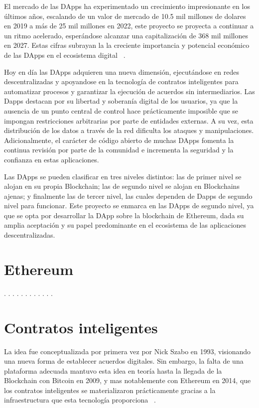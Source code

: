 
El mercado de las DApps ha experimentado un crecimiento impresionante en los últimos años, escalando de un valor de mercado de 10.5 mil millones de dolares en 2019 a más de 25 mil millones en 2022, este proyecto se proyecta a continuar a un ritmo acelerado, esperándose alcanzar una capitalización de 368 mil millones en 2027. Estas cifras subrayan la la creciente importancia y potencial económico de las DApps en el ecosistema digital ~\cite{DAppsEconomía}.

Hoy en día las DApps adquieren una nueva dimensión, ejecutándose en redes descentralizadas y apoyandose en la tecnología de contratos inteligentes para automatizar procesos y garantizar la ejecución de acuerdos sin intermediarios.
Las Dapps destacan por su libertad y soberanía digital de los usuarios, ya que la ausencia de un punto central de control hace prácticamente imposible que se impongan restricciones arbitrarias por parte de entidades externas. A su vez, esta distribución de los datos a través de la red dificulta los ataques y manipulaciones.
Adicionalmente, el carácter de código abierto de muchas DApps fomenta la continua revisión por parte de la comunidad e incrementa la seguridad y la confianza en estas aplicaciones.

Las DApps se pueden clasificar en tres niveles distintos: las de primer nivel se alojan en su propia Blockchain; las de segundo nivel se alojan en Blockchains ajenas; y finalmente las de tercer nivel, las cuales dependen de Dapps de segundo nivel para funcionar.
Este proyecto se enmarca en las DApps de segundo nivel, ya que se opta por desarrollar la DApp sobre la blockchain de Ethereum, dada su amplia aceptación y su papel predominante en el ecosistema de las aplicaciones descentralizadas.


\section{Ethereum}

.
.
.
.
.
.
.
.
.
.
.
.

\section{Contratos inteligentes}


La idea fue conceptualizada por primera vez por Nick Szabo en 1993, visionando una nueva forma de establecer acuerdos digitales. Sin embargo, la falta de una plataforma adecuada mantuvo esta idea en teoría hasta la llegada de la Blockchain con Bitcoin en 2009, y mas notablemente con Ethereum en 2014, que los contratos inteligentes se materializaron prácticamente gracias a la infraestructura que esta tecnología proporciona ~\cite{smartcontractHistoria}.

